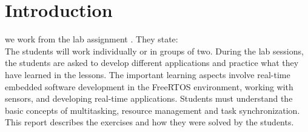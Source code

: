 \section*{Introduction}
\label{sec:introduction}

we work from the lab assignment \cite{Lab_Assignments}. They state: \\

The students will work individually or in groups of two. During the lab sessions, the students are asked to develop different applications and practice what they have learned in the lessons.
The important learning aspects involve real-time embedded software development in the FreeRTOS environment, working with sensors, and developing real-time applications. Students must understand the basic concepts of multitasking, resource management and task synchronization.\\

This report describes the exercises and how they were solved by the students.
